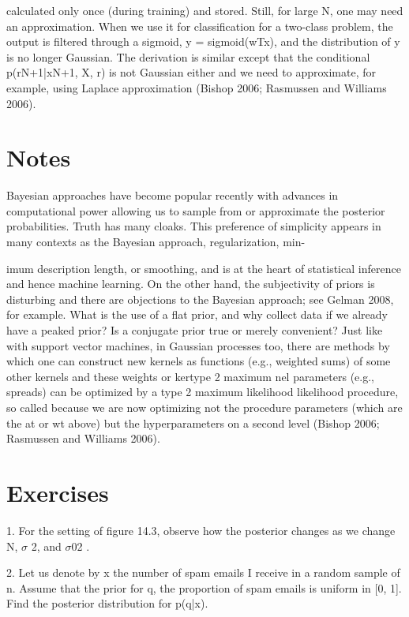 calculated only once (during training) and stored. Still, for large N, one may need an approximation. When we use it for classification for a two-class problem, the output is filtered through a sigmoid, y = sigmoid(wTx), and the distribution of y is no longer Gaussian. The derivation is similar except that the conditional p(rN+1|xN+1, X, r) is not Gaussian either and we need to approximate, for example, using Laplace approximation (Bishop 2006; Rasmussen and Williams 2006).

\section{Notes}

Bayesian approaches have become popular recently with advances in computational power allowing us to sample from or approximate the posterior probabilities. Truth has many cloaks. This preference of simplicity appears in many contexts as the Bayesian approach, regularization, min-

imum description length, or smoothing, and is at the heart of statistical inference and hence machine learning. On the other hand, the subjectivity of priors is disturbing and there are objections to the Bayesian approach; see Gelman 2008, for example. What is the use of a flat prior, and why collect data if we already have a peaked prior? Is a conjugate prior true or merely convenient? Just like with support vector machines, in Gaussian processes too, there are methods by which one can construct new kernels as functions (e.g., weighted sums) of some other kernels and these weights or kertype 2 maximum nel parameters (e.g., spreads) can be optimized by a type 2 maximum likelihood likelihood procedure, so called because we are now optimizing not the procedure parameters (which are the at or wt above) but the hyperparameters on a second level (Bishop 2006; Rasmussen and Williams 2006).

\section{Exercises}

1. For the setting of figure 14.3, observe how the posterior changes as we change N, $\sigma$ 2, and $\sigma$02 .

2. Let us denote by x the number of spam emails I receive in a random sample of n. Assume that the prior for q, the proportion of spam emails is uniform in [0, 1]. Find the posterior distribution for p(q|x).

